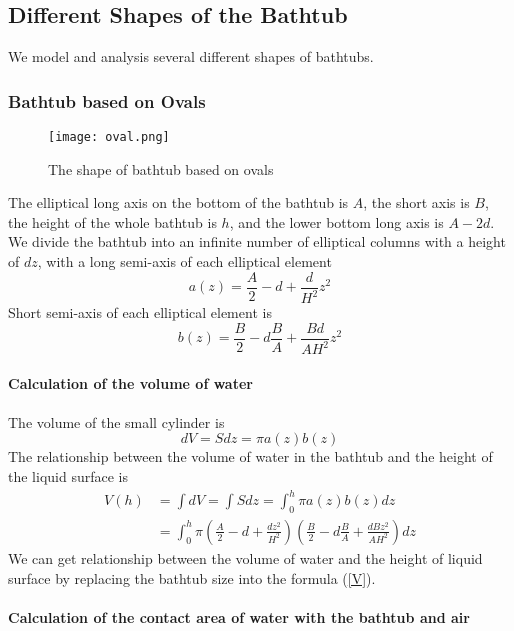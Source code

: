 \documentclass{mcmthesis}
\begin{document}
\subsection{Different Shapes of the Bathtub}
We model and analysis several different shapes of bathtubs.
\subsubsection{Bathtub based on Ovals}
\begin{figure}[H]
\centerline{\texttt{[image: oval.png]}}
\caption{The shape of bathtub based on ovals}
\label{oval}	
\end{figure}
The elliptical long axis on the bottom of the bathtub is $A$, the short axis is $B$, the height of the whole bathtub is $h$, and the lower bottom long axis is $A-2d$.\\
\indent We divide the bathtub into an infinite number of elliptical columns with a height of $dz$, with a long semi-axis of each elliptical element\\
\begin{equation}
a(z)=\frac{A}{2}-d+\frac{d}{{H}^{2}}{z}^{2}
\end{equation}
\indent Short semi-axis of each elliptical element is
\begin{equation}
b(z)=\frac{B}{2}-d\frac{B}{A}+\frac{Bd}{A{H}^{2}}{z}^{2}
\end{equation}\\
\textbf{Calculation of the volume of water} \\\\
\indent The volume of the small cylinder is
\begin{equation}
dV=Sdz=\pi a(z)b(z)
\end{equation}
\indent The relationship between the volume of water in the bathtub and the height of the liquid surface is
\begin{equation}
\begin{split}
V(h)&=\int dV=\int Sdz=\int_{0}^{h}\pi a(z)b(z)dz \\
&=\int_{0}^{h}\pi(\frac{A}{2}-d+\frac{d{z}^{2}}{{H}^{2}})(\frac{B}{2}-d\frac{B}{A}+\frac{dB{z}^{2}}{A{H}^{2}})dz
\label{V}
\end{split}
\end{equation}
\indent We can get relationship between the volume of water and the height of liquid surface by replacing the bathtub size into the formula (\ref{V}).\\\\
\textbf{Calculation of the contact area of water with the bathtub and air} \\\\
\end{document}
